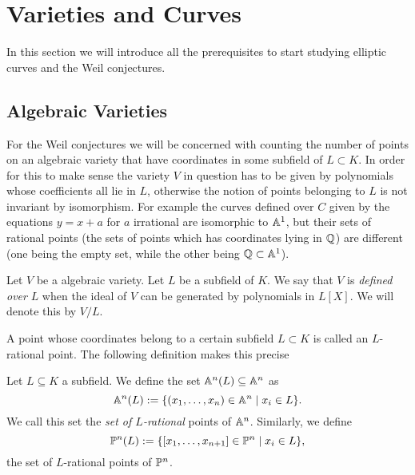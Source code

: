 \section{Varieties and Curves}

In this section we will introduce all the prerequisites to start studying
elliptic curves and the Weil conjectures.

\subsection{Algebraic Varieties}

For the Weil conjectures we will be concerned with counting the
number of points on an algebraic variety that have coordinates
in some subfield of $L \subset K$. In order for this to make sense
the variety $V$ in question has to be given by polynomials whose
coefficients all lie in $L$, otherwise the notion of points belonging to $L$
is not invariant by isomorphism. For example the curves defined
over $C$ given by the equations $y = x + a$ for $a$ irrational
are isomorphic to $\mathbb{A}^1$, but their sets of rational points (the
sets of points which has coordinates lying in $\mathbb{Q}$) are different
(one being the empty set, while the other being $\mathbb{Q}\subset\mathbb{A}^1$).

\begin{definition}
	Let $V$ be a algebraic variety. Let $L$ be a subfield of $K$.
	We say that $V$ is \emph{defined over} $L$ when the ideal of
	$V$ can be generated by polynomials in $L[X]$.
	We will denote this by $V/L$.
\end{definition}

A point whose coordinates belong to a certain subfield $L \subset K$
is called an $L$-rational point. The following definition makes this
precise

\begin{definition}
	Let $L \subseteq K$ a subfield.
	We define the set $\mathbb{A}^n(L) \subseteq \mathbb{A}^n$ as
	\begin{equation*}
		\mathbb{A}^n(L) := \{(x_1, \dots, x_n) \in \mathbb{A}^n \mid x_i \in L\}.
	\end{equation*}
	We call this set the \emph{set of $L$-rational} points of $\mathbb{A}^n$.
	Similarly, we define
	\begin{equation*}
		\mathbb{P}^n(L) := \{[x_1, \dots, x_{n+1}] \in \mathbb{P}^n \mid x_i \in L\},
	\end{equation*}
	the set of $L$-rational points of $\mathbb{P}^n$.
\end{definition}

